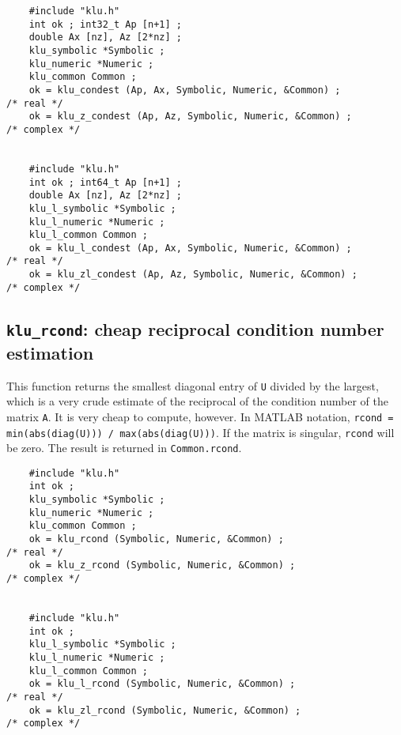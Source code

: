 \documentclass[11pt]{article}
\begin{document}
{\footnotesize
\begin{verbatim}
    #include "klu.h"
    int ok ; int32_t Ap [n+1] ;
    double Ax [nz], Az [2*nz] ;
    klu_symbolic *Symbolic ;
    klu_numeric *Numeric ;
    klu_common Common ;
    ok = klu_condest (Ap, Ax, Symbolic, Numeric, &Common) ;                           /* real */
    ok = klu_z_condest (Ap, Az, Symbolic, Numeric, &Common) ;                         /* complex */


    #include "klu.h"
    int ok ; int64_t Ap [n+1] ;
    double Ax [nz], Az [2*nz] ;
    klu_l_symbolic *Symbolic ;
    klu_l_numeric *Numeric ;
    klu_l_common Common ;
    ok = klu_l_condest (Ap, Ax, Symbolic, Numeric, &Common) ;                         /* real */
    ok = klu_zl_condest (Ap, Az, Symbolic, Numeric, &Common) ;                        /* complex */
\end{verbatim}
}


\subsection{{\tt klu\_rcond}: cheap reciprocal condition number estimation}

This function returns the smallest diagonal entry of {\tt U} divided by the
largest, which is a very crude estimate of the reciprocal of the condition
number of the matrix {\tt A}.  It is very cheap to compute, however.
In MATLAB notation, {\tt rcond = min(abs(diag(U))) / max(abs(diag(U)))}.
If the matrix is singular, {\tt rcond} will be zero.  The result is returned
in {\tt Common.rcond}.


{\footnotesize
\begin{verbatim}
    #include "klu.h"
    int ok ;
    klu_symbolic *Symbolic ;
    klu_numeric *Numeric ;
    klu_common Common ;
    ok = klu_rcond (Symbolic, Numeric, &Common) ;                                     /* real */
    ok = klu_z_rcond (Symbolic, Numeric, &Common) ;                                   /* complex */


    #include "klu.h"
    int ok ;
    klu_l_symbolic *Symbolic ;
    klu_l_numeric *Numeric ;
    klu_l_common Common ;
    ok = klu_l_rcond (Symbolic, Numeric, &Common) ;                                   /* real */
    ok = klu_zl_rcond (Symbolic, Numeric, &Common) ;                                  /* complex */
\end{verbatim}
}
\end{document}
